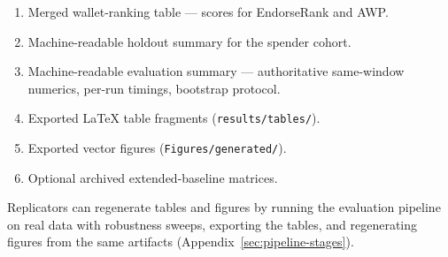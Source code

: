 
\begin{enumerate}
\item Merged wallet-ranking table --- scores for EndorseRank and AWP.
\item Machine-readable holdout summary for the spender cohort.
\item Machine-readable evaluation summary --- authoritative same-window numerics, per-run timings, bootstrap protocol.
\item Exported LaTeX table fragments (\texttt{results/tables/}).
\item Exported vector figures (\texttt{Figures/generated/}).
\item Optional archived extended-baseline matrices.
\end{enumerate}

Replicators can regenerate tables and figures by running the evaluation pipeline on real data with robustness sweeps, exporting the tables, and regenerating figures from the same artifacts (Appendix~\ref{sec:pipeline-stages}).
